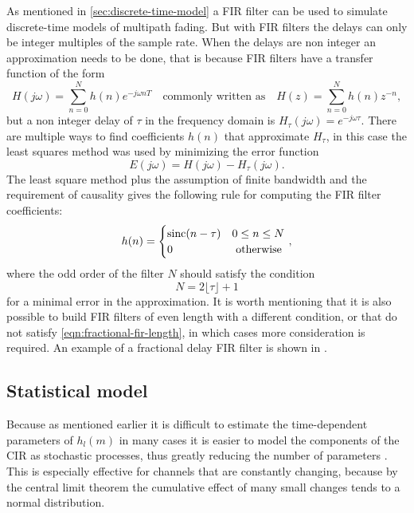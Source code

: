 As mentioned in \ref{sec:discrete-time-model} a FIR filter can be used to simulate discrete-time models of multipath fading. But with FIR filters the delays can only be integer multiples of the sample rate. When the delays are non integer an approximation needs to be done, that is because FIR filters have a transfer function of the form
\begin{equation} \label{eqn:transfer-function-fir}
	H(j\omega) = \sum_{n = 0}^{N} h(n) e^{-j\omega nT}
	\quad \text{commonly written as} \quad
	H(z) = \sum_{n = 0}^{N} h(n) z^{-n},
\end{equation}
but a non integer delay of \(\tau\) in the frequency domain is \(H_\tau(j\omega) = e^{-j\omega \tau}\). There are multiple ways to find coefficients \(h(n)\) that approximate \(H_\tau\), in this case the least squares method was used by minimizing the error function
\begin{equation}
	E(j\omega) = H(j\omega) - H_\tau(j\omega).
\end{equation}
The least square method plus the assumption of finite bandwidth and the requirement of causality gives the following rule for computing the FIR filter coefficients:
\begin{equation}
	h(n)= \begin{cases}
		\operatorname{sinc} (n - \tau) & 0 \leq n \leq N \\ 
		0 & \text { otherwise }
	\end{cases},
\end{equation}
where the odd order of the filter \(N\) should satisfy the condition
\begin{equation} \label{eqn:fractional-fir-length}
	N = 2 \lfloor \tau \rfloor + 1
\end{equation}
for a minimal error in the approximation. It is worth mentioning that it is also possible to build FIR filters of even length with a different condition, or that do not satisfy \eqref{eqn:fractional-fir-length}, in which cases more consideration is required. An example of a fractional delay FIR filter is shown in .

\subsection{Statistical model} \label{sec:statistical-model}

Because as mentioned earlier it is difficult to estimate the time-dependent parameters of \(h_l(m)\) in many cases it is easier to model the components of the CIR as stochastic processes, thus greatly reducing the number of parameters \cite{Messier,Mathis}. This is especially effective for channels that are constantly changing, because by the central limit theorem the cumulative effect of many small changes tends to a normal distribution.


